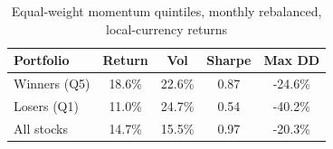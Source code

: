 \begin{table}[H]
\centering
\caption{Equal-weight momentum quintiles, monthly rebalanced, local-currency returns}
\begin{tabular}{lcccc}
\toprule
Portfolio & Return & Vol & Sharpe & Max DD \\
\midrule
Winners (Q5) & 18.6\% & 22.6\% & 0.87 & -24.6\% \\
Losers (Q1) & 11.0\% & 24.7\% & 0.54 & -40.2\% \\
All stocks & 14.7\% & 15.5\% & 0.97 & -20.3\% \\
\bottomrule
\end{tabular}
\end{table}
